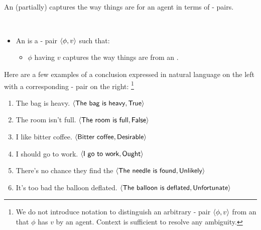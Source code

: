 \paragraph*{}

\begin{note}
  An \evalN{} (partially) captures the way things are for an agent in terms of - pairs.

    \begin{definition}[\evalN{3}]
      \label{def:evals}
      \mbox{ }
      \vspace{-\baselineskip}
      \begin{itemize}
      \item
        An \emph{\evalN{}} is a - pair \(\langle \phi, v \rangle\) such that:
        \begin{itemize}
        \item
          \(\phi\) having  \(v\) captures the way things are from an \agpe{}.
        \end{itemize}
      \end{itemize}
      \vspace{-\baselineskip}
    \end{definition}

    \noindent%
    Here are a few examples of a conclusion expressed in natural language on the left with a corresponding - pair on the right:%
    \footnote{
      We do not introduce notation to distinguish an arbitrary - pair \(\langle \phi, v \rangle\) from an \eval{} that \(\phi\) has  \(v\) by an agent.
      Context is sufficient to resolve any ambiguity.
    }

    \begin{enumerate}[label=\arabic*., ref=(\arabic*),noitemsep, series=propValExC]
    \item
      The bag is heavy.%
      \hfill%
      \(\pv{\propI{The bag is heavy}}{\valI{True}}\)
    \item
      The room isn't full.%
      \hfill%
      \(\pv{\propI{The room is full}}{\valI{False}}\)
    \item
      \label{pvEx:bC}
      I like bitter coffee.%
      \hfill%
      \(\pv{\propI{Bitter coffee}}{\valI{Desirable}}\)
    \item
      I should go to work.%
      \hfill%
      \(\pv{\propI{I go to work}}{\valI{Ought}}\)
    \item
      There's no chance they find the%
      \hfill%
      \(\pv{\propI{The needle is found}}{\valI{Unlikely}}\)
    \item
      It's too bad the balloon deflated.%
      \hfill%
      \(\pv{\propI{The balloon is deflated}}{\valI{Unfortunate}}\)
    \end{enumerate}


\end{note}
